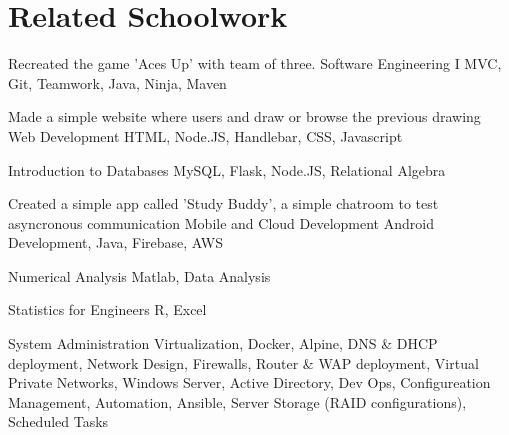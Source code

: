 \documentclass{tccv}
\begin{document}
\section{Related Schoolwork}
	\begin{yearlist}
		\item [Recreated the game 'Aces Up' with team of three.]
			{} %
			{Software Engineering I }
			{MVC, Git, Teamwork, Java, Ninja, Maven}

		\item [Made a simple website where users and draw or browse the previous drawing]
			{} %
			{Web Development}
			{HTML, Node.JS, Handlebar, CSS, Javascript}

		\item {} %
			{Introduction to Databases}
			{MySQL, Flask, Node.JS, Relational Algebra }

		\item [Created a simple app called 'Study Buddy', a simple chatroom to test asyncronous communication] 
			{} %
			{Mobile and Cloud Development}
			{Android Development, Java, Firebase, AWS}

		\item {} %
			{Numerical Analysis}
			{Matlab, Data Analysis}

		\item {} %
			{Statistics for Engineers}
			{R, Excel}
		
		\item []{} %
			{System Administration}
			{Virtualization, Docker, Alpine, DNS \& DHCP deployment, Network Design, Firewalls, Router \& WAP deployment, Virtual Private Networks, Windows Server, Active Directory, Dev Ops, Configureation Management, Automation, Ansible, Server Storage (RAID configurations), Scheduled Tasks}

		\end{yearlist}
	
\end{document}
